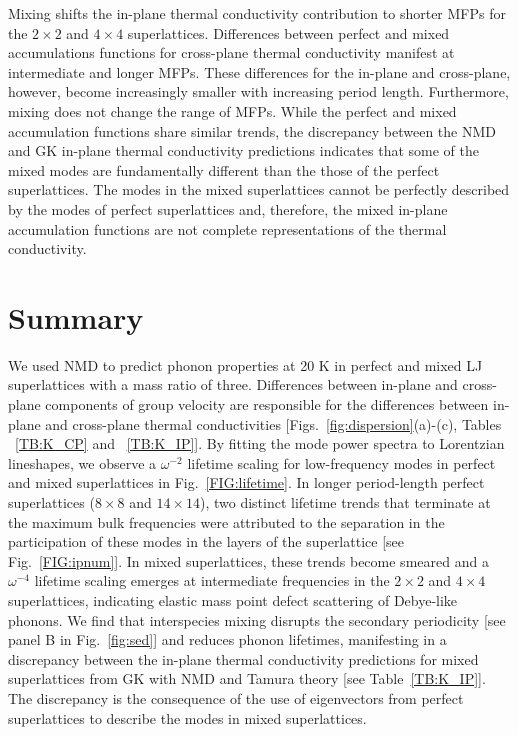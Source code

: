 \documentclass[aps,prb,preprint,preprintnumbers,amsmath,amssymb,floatfix,superscriptaddress]{revtex4}
\begin{document}
Mixing shifts the in-plane thermal conductivity contribution to shorter MFPs for the $2 \times 2 $ and $4 \times 4 $ superlattices. Differences between perfect and mixed accumulations functions for cross-plane thermal conductivity manifest at intermediate and longer MFPs. These differences for the in-plane and cross-plane, however, become increasingly smaller with increasing period length. Furthermore, mixing does not change the range of MFPs. While the perfect and mixed accumulation functions share similar trends, the discrepancy between the NMD and GK in-plane thermal conductivity predictions indicates that some of the mixed modes are fundamentally different than the those of the perfect superlattices. The modes in the mixed superlattices cannot be perfectly described by the modes of perfect superlattices and, therefore, the mixed in-plane accumulation functions are not complete representations of the thermal conductivity.

\section{Summary}

We used NMD to predict phonon properties at 20 K in perfect and mixed LJ superlattices with a mass ratio of three. Differences between in-plane and cross-plane components of group velocity are responsible for the differences between in-plane and cross-plane thermal conductivities [Figs.~\ref{fig:dispersion}(a)-(c), Tables ~\ref{TB:K_CP} and ~\ref{TB:K_IP}]. By fitting the mode power spectra to Lorentzian lineshapes, we observe a $\omega^{-2}$ lifetime scaling for low-frequency modes in perfect and mixed superlattices in Fig.~\ref{FIG:lifetime}. In longer period-length perfect superlattices ($8 \times 8$ and $14 \times 14$), two distinct lifetime trends that terminate at the maximum bulk frequencies were attributed to the separation in the participation of these modes in the layers of the superlattice [see Fig.~\ref{FIG:ipnum}]. In mixed superlattices, these trends become smeared and a $\omega^{-4}$ lifetime scaling emerges at intermediate frequencies in the $2 \times 2$ and $4 \times 4$ superlattices, indicating elastic mass point defect scattering of Debye-like phonons. We find that interspecies mixing disrupts the secondary periodicity [see panel B in Fig.~\ref{fig:sed}] and reduces phonon lifetimes, manifesting in a discrepancy between the in-plane thermal conductivity predictions for mixed superlattices from GK with NMD and Tamura theory [see Table~\ref{TB:K_IP}]. The discrepancy is the consequence of the use of eigenvectors from perfect superlattices to describe the modes in mixed superlattices.
\end{document}
